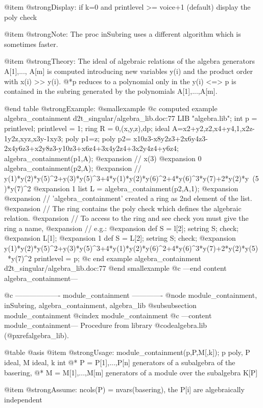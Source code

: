 @item @strong{Display:}
if k=0 and printlevel >= voice+1 (default) display the poly check

@item @strong{Note:}
The proc inSubring uses a different algorithm which is sometimes
faster.

@item @strong{Theory:}
The ideal of algebraic relations of the algebra generators A[1],...,
A[m] is computed introducing new variables y(i) and the product
order with x(i) >> y(i).
@*p reduces to a polynomial only in the y(i) <=> p is contained in the
subring generated by the polynomials A[1],...,A[m].

@end table
@strong{Example:}
@smallexample
@c computed example algebra_containment d2t_singular/algebra_lib.doc:77 
LIB "algebra.lib";
int p = printlevel; printlevel = 1;
ring R = 0,(x,y,z),dp;
ideal A=x2+y2,z2,x4+y4,1,x2z-1y2z,xyz,x3y-1xy3;
poly p1=z;
poly p2=
x10z3-x8y2z3+2x6y4z3-2x4y6z3+x2y8z3-y10z3+x6z4+3x4y2z4+3x2y4z4+y6z4;
algebra_containment(p1,A);
@expansion{} // x(3)
@expansion{} 0
algebra_containment(p2,A);
@expansion{} // y(1)*y(2)*y(5)^2+y(3)*y(5)^3+4*y(1)*y(2)*y(6)^2+4*y(6)^3*y(7)+2*y(2)*y\
   (5)*y(7)^2
@expansion{} 1
list L = algebra_containment(p2,A,1);
@expansion{} 
@expansion{} // 'algebra_containment' created a ring as 2nd element of the list.
@expansion{} // The ring contains the poly check which defines the algebraic relation.
@expansion{} // To access to the ring and see check you must give the ring a name,
@expansion{} // e.g.:
@expansion{}                def S = l[2]; setring S; check;
@expansion{} 	
L[1];
@expansion{} 1
def S = L[2]; setring S;
check;
@expansion{} y(1)*y(2)*y(5)^2+y(3)*y(5)^3+4*y(1)*y(2)*y(6)^2+4*y(6)^3*y(7)+2*y(2)*y(5)\
   *y(7)^2
printlevel = p;
@c end example algebra_containment d2t_singular/algebra_lib.doc:77
@end smallexample
@c ---end content algebra_containment---

@c ------------------- module_containment -------------
@node module_containment, inSubring, algebra_containment, algebra_lib
@subsubsection module_containment
@cindex module_containment
@c ---content module_containment---
Procedure from library @code{algebra.lib} (@pxref{algebra_lib}).

@table @asis
@item @strong{Usage:}
module_containment(p,P,M[,k]); p poly, P ideal, M ideal, k int
@* P = P[1],...,P[n] generators of a subalgebra of the basering,
@* M = M[1],...,M[m] generators of a module over the subalgebra K[P]

@item @strong{Assume:}
ncols(P) = nvars(basering), the P[i] are algebraically independent

